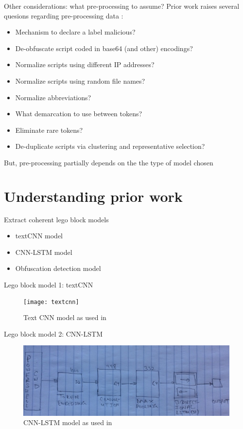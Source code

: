 \documentclass[10pt]{beamer}
\begin{document}
\begin{frame}{Other considerations: what pre-processing to assume?}
	Prior work raises several quesions regarding pre-processing data \cite{powershell2018,amsi2019,feye2018}:
	\begin{itemize}
		\item Mechanism to declare a label malicious?
		\item De-obfuscate script coded in base64 (and other) encodings?
		\item Normalize scripts using different IP addresses?
		\item Normalize scripts using random file names?
		\item Normalize abbreviations?
		\item What demarcation to use between tokens?
		\item Eliminate rare tokens?
		\item De-duplicate scripts via clustering and representative selection?
	\end{itemize}
	But, pre-processing partially depends on the the type of model chosen
\end{frame}

\section{Understanding prior work}

\begin{frame}[fragile]{Extract coherent lego block models}
	\begin{itemize}
		\item textCNN model \cite{textcnn2016,textcnn2019,powershell2018}
		\item CNN-LSTM model \cite{amsi2019}
		\item Obfuscation detection model \cite{feye2018}
	\end{itemize}
\end{frame}

\begin{frame}[fragile]{Lego block model 1: textCNN}
	\begin{figure}
		\texttt{[image: textcnn]}
		\caption{Text CNN model as used in \cite{powershell2018}}
	\end{figure}
\end{frame}

\begin{frame}[fragile]{Lego block model 2: CNN-LSTM}
	\begin{figure}
		\includegraphics[scale=0.50]{cnn-lstm}
		\caption{CNN-LSTM model as used in \cite{amsi2019}}
	\end{figure}
\end{frame}
\end{document}
